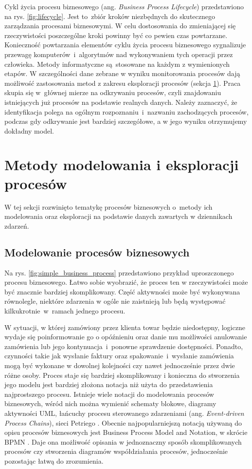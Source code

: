 Cykl życia procesu biznesowego (ang. \textit{Business Process Lifecycle}) przedstawiono na rys. \ref{fig:lifecycle}. Jest to~zbiór kroków niezbędnych do skutecznego zarządzania procesami biznesowymi. W celu dostosowania do zmieniającej się rzeczywistości poszczególne kroki powinny być co pewien czas powtarzane. Konieczność powtarzania elementów cyklu życia procesu biznesowego sygnalizuje przewagę komputerów~i~algorytmów nad wykonywaniem tych operacji przez człowieka. Metody informatyczne są~stosowane na każdym z wymienionych etapów. W szczególności dane zebrane w wyniku monitorowania procesów dają możliwość zastosowania metod z zakresu eksploracji procesów (sekcja \ref{sec:eksploracja}). Praca skupia się w~głównej mierze na odkrywaniu procesów, czyli znajdowaniu istniejących już procesów na podstawie realnych danych. Należy zaznaczyć, że identyfikacja polega na ogólnym rozpoznaniu~i~nazwaniu zachodzących procesów, podczas gdy odkrywanie jest bardziej szczegółowe, a w jego wyniku otrzymujemy dokładny model.  


\section{Metody modelowania i eksploracji procesów}
\label{sec:eksploracja}
W tej sekcji rozwinięto tematykę procesów biznesowych o~metody ich modelowania oraz eksploracji na podstawie danych zawartych w dziennikach zdarzeń.

\subsection{Modelowanie procesów biznesowych}
\label{sec:modelling}
Na rys. \ref{fig:simple_business_process} przedstawiono przykład uproszczonego procesu biznesowego. Łatwo sobie wyobrazić, że proces ten w rzeczywistości może być znacznie bardziej skomplikowany. Część aktywności może być wykonywana równolegle, niektóre zdarzenia w ogóle nie zaistnieją lub będą występować kilkukrotnie~w~ramach jednego procesu. 

W sytuacji, w której zamówiony przez klienta towar będzie niedostępny, logiczne wydaje się poinformowanie go o opóźnieniu oraz danie mu możliwości anulowanie zamówienia lub jego kontynuacja~i~ponowne sprawdzenie dostępności. Ponadto, czynności takie jak wysłanie faktury oraz spakowanie~i~wysłanie zamówienia mogą być wykonane w dowolnej kolejności czy nawet jednocześnie przez dwie różne osoby. Proces staje się bardziej skomplikowany i konieczna do stworzenia jego modelu jest bardziej złożona notacja niż użyta do przedstawienia najprostszego procesu. 
Istnieje wiele notacji do modelowania procesów biznesowych, wśród nich można wymienić schematy blokowe, diagramy aktywności UML, łańcuchy procesu sterowanego zdarzeniami (ang. \textit{Event-driven Process Chains}), sieci Petriego \cite{BPMComparission}. Obecnie najpopularniejszą notacją używaną do opisu procesów biznesowych jest Business Process  Model and Notation, w skrócie BPMN \cite{omg2011bpmn}. Daje ona możliwość opisania w jednoznaczny sposób skomplikowanych procesów czy stworzenia diagramów współdziałania procesów, jednocześnie pozostając łatwą do zrozumienia.

